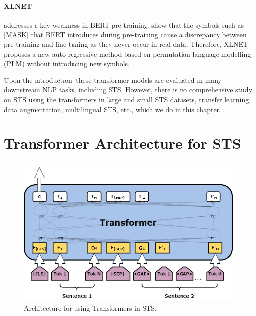 \paragraph{XLNET} \autocite{yang2019xlnet} addresses a key weakness in BERT pre-training. \textcite{yang2019xlnet} show that the symbols such as \textsc{[MASK]} that BERT introduces during pre-training cause a discrepancy between pre-training and fine-tuning as they never occur in real data. Therefore, XLNET proposes a new auto-regressive method based on permutation language modelling (PLM) \autocite{JMLR:v17:16-272} without introducing new symbols. 

Upon the introduction, these transformer models are evaluated in many downstream NLP tasks, including STS. However, there is no comprehensive study on STS using the transformers in large and small STS datasets, transfer learning, data augmentation, multilingual STS, etc., which we do in this chapter.

\section{Transformer Architecture for STS}
\label{sec:transformer_method}

\begin{figure}[ht]
	\centering
	\includegraphics[scale=0.4]{figures/semantic_textual_similarity/transformers/STSTransformers.png}
	\caption[Architecture for using Transformers in STS]{Architecture for using Transformers in STS.}
	\label{fig:sts_transformers}
\end{figure}

